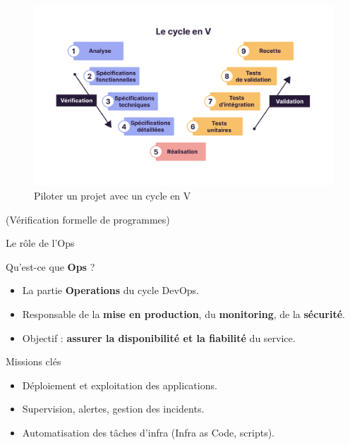 \documentclass[aspectratio=169,10pt]{beamer}
\begin{document}
\begin{frame}
\vspace{-0.8cm}
\begin{figure}
    \hspace*{-1cm}%
    \includegraphics[scale=0.68]{figures/cycleV.png}
    \caption{Piloter un projet avec un cycle en V}
\end{figure}
 
\end{frame}


\begin{frame}{(Vérification formelle de programmes)}


 
\end{frame}


\begin{frame}{Le rôle de l'Ops}

 \begin{alertblock}{Qu’est-ce que \textbf{Ops} ?}
    \begin{itemize}
      \item La partie \textbf{Operations} du cycle DevOps.
      \item Responsable de la \textbf{mise en production}, du \textbf{monitoring}, de la \textbf{sécurité}.
      \item Objectif : \textbf{assurer la disponibilité et la fiabilité} du service.
    \end{itemize}
  \end{alertblock}

  \begin{alertblock}{Missions clés}
    \begin{itemize}
      \item Déploiement et exploitation des applications.
      \item Supervision, alertes, gestion des incidents.
      \item Automatisation des tâches d’infra (Infra as Code, scripts).
    \end{itemize}
  \end{alertblock}

\end{frame}
\end{document}

